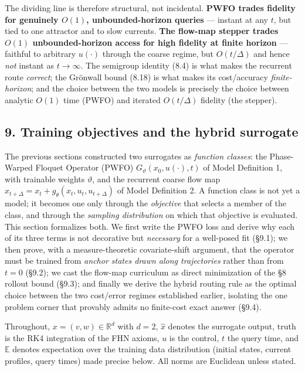 \documentclass[
  11pt,
]{article}
\begin{document}
The dividing line is therefore structural, not incidental. \textbf{PWFO
trades fidelity for genuinely \(O(1)\), unbounded-horizon queries} ---
instant at any \(t\), but tied to one attractor and to slow currents.
\textbf{The flow-map stepper trades \(O(1)\) unbounded-horizon access
for high fidelity at finite horizon} --- faithful to arbitrary
\(u(\cdot)\) through the coarse regime, but \(O(t/\Delta)\) and hence
\emph{not} instant as \(t\to\infty\). The semigroup identity (8.4) is
what makes the recurrent route \emph{correct}; the Grönwall bound (8.18)
is what makes its cost/accuracy \emph{finite-horizon}; and the choice
between the two models is precisely the choice between analytic \(O(1)\)
time (PWFO) and iterated \(O(t/\Delta)\) fidelity (the stepper).

\subsection{9. Training objectives and the hybrid
surrogate}\label{training-objectives-and-the-hybrid-surrogate}

The previous sections constructed two surrogates as \emph{function
classes}: the Phase-Warped Floquet Operator (PWFO)
\(G_\vartheta(x_0,u(\cdot),t)\) of Model Definition 1, with trainable
weights \(\vartheta\), and the recurrent coarse flow map
\(x_{t+\Delta}=x_t+g_\theta(x_t,u_t,u_{t+\Delta})\) of Model Definition
2. A function class is not yet a model; it becomes one only through the
\emph{objective} that selects a member of the class, and through the
\emph{sampling distribution} on which that objective is evaluated. This
section formalizes both. We first write the PWFO loss and derive why
each of its three terms is not decorative but \emph{necessary} for a
well-posed fit (§9.1); we then prove, with a measure-theoretic
covariate-shift argument, that the operator must be trained from
\emph{anchor states drawn along trajectories} rather than from \(t=0\)
(§9.2); we cast the flow-map curriculum as direct minimization of the §8
rollout bound (§9.3); and finally we derive the hybrid routing rule as
the optimal choice between the two cost/error regimes established
earlier, isolating the one problem corner that provably admits no
finite-cost exact answer (§9.4).

Throughout, \(x=(v,w)\in\mathbb{R}^{d}\) with \(d=2\), \(\hat{x}\)
denotes the surrogate output, truth is the RK4 integration of the FHN
axioms, \(u\) is the control, \(t\) the query time, and \(\mathbb{E}\)
denotes expectation over the training data distribution (initial states,
current profiles, query times) made precise below. All norms are
Euclidean unless stated.
\end{document}
